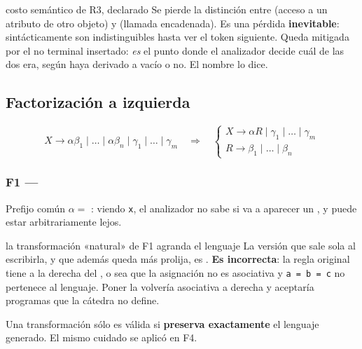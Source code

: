 \begin{decision}{costo semántico de R3, declarado}
Se pierde la distinción entre  (acceso a un atributo de otro objeto) y
 (llamada encadenada). Es una pérdida \textbf{inevitable}: sintácticamente son
indistinguibles hasta ver el token siguiente. Queda mitigada por el no terminal insertado:
 \emph{es} el punto donde el analizador decide cuál de las dos era,
según haya derivado a vacío o no. El nombre lo dice.
\end{decision}

\subsection{Factorización a izquierda}

\[ X \to \alpha\beta_1 \mid \dots \mid \alpha\beta_n \mid \gamma_1 \mid \dots \mid \gamma_m
\quad\Longrightarrow\quad
\begin{cases} X \to \alpha R \mid \gamma_1 \mid \dots \mid \gamma_m \\ R \to \beta_1 \mid \dots \mid \beta_n \end{cases} \]

\subsubsection{F1 --- }

 Prefijo común $\alpha = $ : viendo \texttt{x}, el analizador no
sabe si va a aparecer un \tl{=}, y puede estar arbitrariamente lejos.

\begin{producciones}
\end{producciones}

\begin{decision}{la transformación «natural» de F1 agranda el lenguaje}
La versión que sale sola al escribirla, y que además queda más prolija, es
 \deriva{}   \alt{} \eps. \textbf{Es
incorrecta}: la regla original tiene  a la derecha del \tl{=}, o sea que la
asignación no es asociativa y \texttt{a = b = c} no pertenece al lenguaje. Poner 
la volvería asociativa a derecha y aceptaría programas que la cátedra no define.

Una transformación sólo es válida si \textbf{preserva exactamente} el lenguaje generado. El mismo
cuidado se aplicó en F4.
\end{decision}

